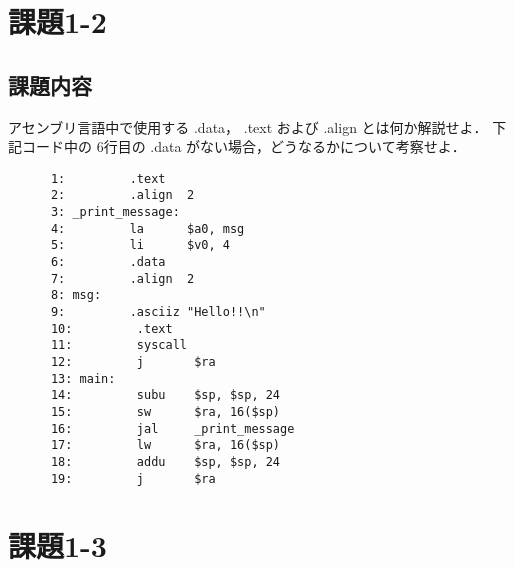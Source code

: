 \documentclass[a4j,11pt]{jarticle}
\begin{document}


\section{課題1-2}

\subsection{課題内容}
アセンブリ言語中で使用する .data， .text および .align とは何か解説せよ．
 下記コード中の 6行目の .data がない場合，どうなるかについて考察せよ．

\begin{verbatim}
      1:         .text
      2:         .align  2
      3: _print_message:
      4:         la      $a0, msg
      5:         li      $v0, 4
      6:         .data
      7:         .align  2
      8: msg:
      9:         .asciiz "Hello!!\n"
      10:         .text
      11:         syscall
      12:         j       $ra
      13: main:
      14:         subu    $sp, $sp, 24
      15:         sw      $ra, 16($sp)
      16:         jal     _print_message
      17:         lw      $ra, 16($sp)
      18:         addu    $sp, $sp, 24
      19:         j       $ra
\end{verbatim}





\section{課題1-3}
\end{document}
